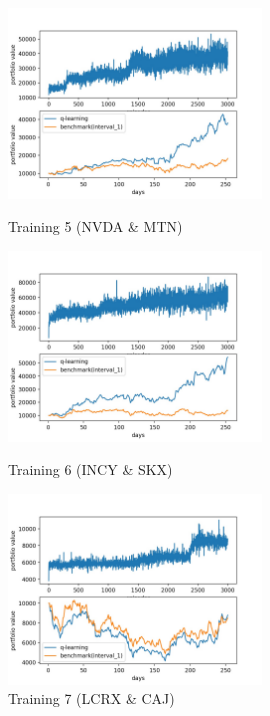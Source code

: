 \begin{figure}[H]
\begin{center}
\includegraphics[clip, width=0.6\textwidth]{Graphics/q_learning_NM5.jpg} \caption{Training 5 (NVDA \& MTN)}
\includegraphics[clip, width=0.6\textwidth]{Graphics/q_learning_IS6.jpg} \caption{Training 6 (INCY \& SKX)}
\includegraphics[clip, width=0.6\textwidth]{Graphics/q_learning_LC7.jpg} \caption{Training 7 (LCRX \& CAJ)}
\end{center}
\end{figure}

